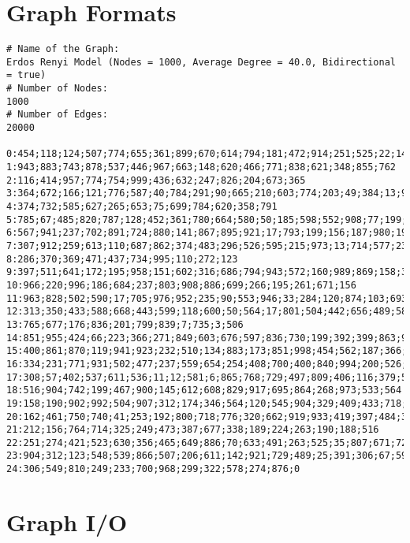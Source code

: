 
\section{Graph Formats}
\label{sec:appendix:graph-formats}


\begin{lstlisting}[label={lst:graph-formats:gtna},caption={GTNA graph format}]
# Name of the Graph:
Erdos Renyi Model (Nodes = 1000, Average Degree = 40.0, Bidirectional = true)
# Number of Nodes:
1000
# Number of Edges:
20000

0:454;118;124;507;774;655;361;899;670;614;794;181;472;914;251;525;22;141;24
1:943;883;743;878;537;446;967;663;148;620;466;771;838;621;348;855;762
2:116;414;957;774;754;999;436;632;247;826;204;673;365
3:364;672;166;121;776;587;40;784;291;90;665;210;603;774;203;49;384;13;973
4:374;732;585;627;265;653;75;699;784;620;358;791
5:785;67;485;820;787;128;452;361;780;664;580;50;185;598;552;908;77;199;292;951;466;209;154;364;934;272;947
6:567;941;237;702;891;724;880;141;867;895;921;17;793;199;156;187;980;191;473;343;741;458;870;994
7:307;912;259;613;110;687;862;374;483;296;526;595;215;973;13;714;577;235;676;756;170;90;223;796
8:286;370;369;471;437;734;995;110;272;123
9:397;511;641;172;195;958;151;602;316;686;794;943;572;160;989;869;158;398;814;138;873;415;300;57;205;756;864
10:966;220;996;186;684;237;803;908;886;699;266;195;261;671;156
11:963;828;502;590;17;705;976;952;235;90;553;946;33;284;120;874;103;693;153;255;583;168;478;527
12:313;350;433;588;668;443;599;118;600;50;564;17;801;504;442;656;489;582;84;965;140;666;340;247;902;578
13:765;677;176;836;201;799;839;7;735;3;506
14:851;955;424;66;223;366;271;849;603;676;597;836;730;199;392;399;863;907;209;333;130;885;984
15:400;861;870;119;941;923;232;510;134;883;173;851;998;454;562;187;366;236;382
16:334;231;771;931;502;477;237;559;654;254;408;700;400;840;994;200;526;170
17:308;57;402;537;611;536;11;12;581;6;865;768;729;497;809;406;116;379;520;749;481
18:516;904;742;199;467;900;145;612;608;829;917;695;864;268;973;533;564
19:158;190;902;992;504;907;312;174;346;564;120;545;904;329;409;433;718;422
20:162;461;750;740;41;253;192;800;718;776;320;662;919;933;419;397;484;344
21:212;156;764;714;325;249;473;387;677;338;189;224;263;190;188;516
22:251;274;421;523;630;356;465;649;886;70;633;491;263;525;35;807;671;724;109;921;111;771;30;849;947;994;856;601;52;0
23:904;312;123;548;539;866;507;206;611;142;921;729;489;25;391;306;67;599;84;408;378
24:306;549;810;249;233;700;968;299;322;578;274;876;0
\end{lstlisting}





\section{Graph I/O}
\label{sec:appendix:graph-io}